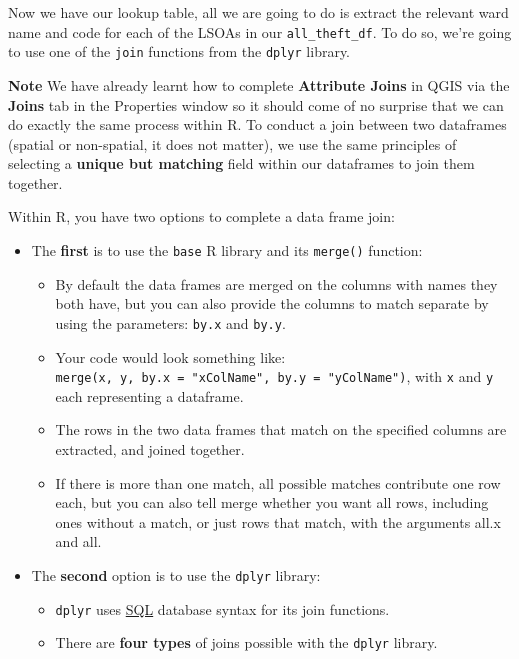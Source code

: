 \documentclass[
]{book}
\providecommand{\tightlist}{%
  \setlength{\itemsep}{0pt}\setlength{\parskip}{0pt}}
\begin{document}
Now we have our lookup table, all we are going to do is extract the relevant ward name and code for each of the LSOAs in our \texttt{all\_theft\_df}. To do so, we're going to use one of the \texttt{join} functions from the \texttt{dplyr} library.

\textbf{Note}
We have already learnt how to complete \textbf{Attribute Joins} in QGIS via the \textbf{Joins} tab in the Properties window so it should come of no surprise that we can do exactly the same process within R. To conduct a join between two dataframes (spatial or non-spatial, it does not matter), we use the same principles of selecting a \textbf{unique but matching} field within our dataframes to join them together.

Within R, you have two options to complete a data frame join:

\begin{itemize}
\tightlist
\item
  The \textbf{first} is to use the \texttt{base} R library and its \texttt{merge()} function:

  \begin{itemize}
  \tightlist
  \item
    By default the data frames are merged on the columns with names they both have, but you can also provide the columns to match separate by using the parameters: \texttt{by.x} and \texttt{by.y}.
  \item
    Your code would look something like: \texttt{merge(x,\ y,\ by.x\ =\ "xColName",\ by.y\ =\ "yColName")}, with \texttt{x} and \texttt{y} each representing a dataframe.
  \item
    The rows in the two data frames that match on the specified columns are extracted, and joined together.
  \item
    If there is more than one match, all possible matches contribute one row each, but you can also tell merge whether you want all rows, including ones without a match, or just rows that match, with the arguments all.x and all.
  \end{itemize}
\item
  The \textbf{second} option is to use the \texttt{dplyr} library:

  \begin{itemize}
  \tightlist
  \item
    \texttt{dplyr} uses \href{https://en.wikipedia.org/wiki/SQL}{SQL} database syntax for its join functions.
  \item
    There are \textbf{four types} of joins possible with the \texttt{dplyr} library.


\end{itemize}
\end{itemize}
\end{document}
